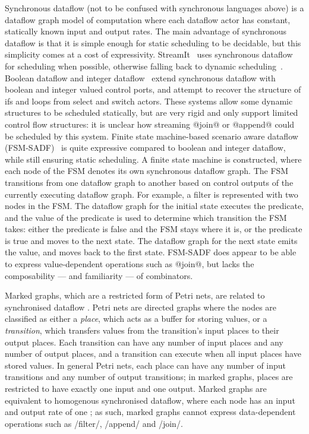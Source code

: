 Synchronous dataflow (not to be confused with synchronous languages above) is a dataflow graph model of computation where each dataflow actor has constant, statically known input and output rates.
The main advantage of synchronous dataflow is that it is simple enough for static scheduling to be decidable, but this simplicity comes at a cost of expressivity.
StreamIt~\cite{thies2002streamit} uses synchronous dataflow for scheduling when possible, otherwise falling back to dynamic scheduling~\cite{soule2013dynamic}.
Boolean dataflow and integer dataflow~\cite{buck1993scheduling,buck1994static} extend synchronous dataflow with boolean and integer valued control ports, and attempt to recover the structure of ifs and loops from select and switch actors.
These systems allow some dynamic structures to be scheduled statically, but are very rigid and only support limited control flow structures: it is unclear how streaming @join@ or @append@ could be scheduled by this system.
Finite state machine-based scenario aware dataflow (FSM-SADF)~\cite{stuijk2011scenario,van2015scenario} is quite expressive compared to boolean and integer dataflow, while still ensuring static scheduling.
A finite state machine is constructed, where each node of the FSM denotes its own synchronous dataflow graph.
The FSM transitions from one dataflow graph to another based on control outputs of the currently executing dataflow graph.
For example, a filter is represented with two nodes in the FSM.
The dataflow graph for the initial state executes the predicate, and the value of the predicate is used to determine which transition the FSM takes: either the predicate is false and the FSM stays where it is, or the predicate is true and moves to the next state.
The dataflow graph for the next state emits the value, and moves back to the first state.
FSM-SADF does appear to be able to express value-dependent operations such as @join@, but lacks the composability --- and familiarity --- of combinators.

Marked graphs, which are a restricted form of Petri nets, are related to synchronised dataflow \citep{johnsonbaugh1982petri}.
Petri nets are directed graphs where the nodes are classified as either a \emph{place}, which acts as a buffer for storing values, or a \emph{transition}, which transfers values from the transition's input places to their output places.
Each transition can have any number of input places and any number of output places, and a transition can execute when all input places have stored values.
In general Petri nets, each place can have any number of input transitions and any number of output transitions; in marked graphs, places are restricted to have exactly one input and one output.
Marked graphs are equivalent to homogenous synchronised dataflow, where each node has an input and output rate of one \citep{bouakaz2013real}; as such, marked graphs cannot express data-dependent operations such as \Hs/filter/, \Hs/append/ and \Hs/join/.

